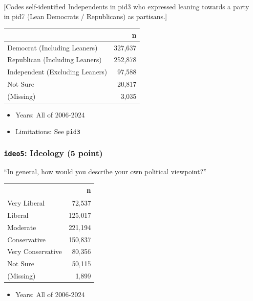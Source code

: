 \documentclass[10pt,article,oneside]{memoir}
\begin{document}
{[}Codes self-identified Independents in pid3 who expressed leaning
towards a party in pid7 (Lean Democrats / Republicans) as partisans.{]}

\begin{table}[H]
\centering
\begin{tabular}[t]{lr}
\toprule
 & n\\
\midrule
Democrat (Including Leaners) & 327,637\\
Republican (Including Leaners) & 252,878\\
Independent (Excluding Leaners) & 97,588\\
Not Sure & 20,817\\
(Missing) & 3,035\\
\bottomrule
\end{tabular}
\end{table}

\begin{itemize}
\tightlist
\item
  Years: All of 2006-2024
\item
  Limitations: See \texttt{pid3}
\end{itemize}

\subsubsection{\texorpdfstring{\texttt{ideo5}: Ideology (5
point)}{ideo5: Ideology (5 point)}}\label{ideo5-ideology-5-point}

``In general, how would you describe your own political viewpoint?''

\begin{table}[H]
\centering
\begin{tabular}[t]{lr}
\toprule
 & n\\
\midrule
Very Liberal & 72,537\\
Liberal & 125,017\\
Moderate & 221,194\\
Conservative & 150,837\\
Very Conservative & 80,356\\
Not Sure & 50,115\\
(Missing) & 1,899\\
\bottomrule
\end{tabular}
\end{table}

\begin{itemize}
\tightlist
\item
  Years: All of 2006-2024
\end{itemize}
\end{document}
